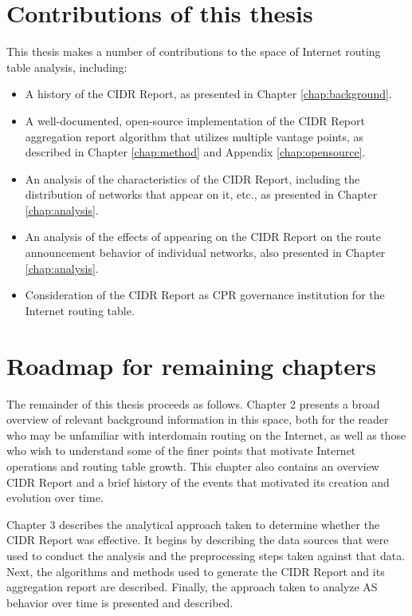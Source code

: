 \section{Contributions of this thesis}

This thesis makes a number of contributions to the space of Internet routing table analysis, including:
\begin{itemize}
\item{A history of the CIDR Report, as presented in Chapter \ref{chap:background}.}
\item{A well-documented, open-source implementation of the CIDR Report aggregation report algorithm that utilizes multiple vantage points, as described in Chapter \ref{chap:method} and Appendix \ref{chap:opensource}.}
\item{An analysis of the characteristics of the CIDR Report, including the distribution of networks that appear on it, etc., as presented in Chapter \ref{chap:analysis}.}
\item{An analysis of the effects of appearing on the CIDR Report on the route announcement behavior of individual networks, also presented in Chapter \ref{chap:analysis}.}
\item{Consideration of the CIDR Report as CPR governance institution for the Internet routing table.}
\end{itemize}

\section{Roadmap for remaining chapters}

The remainder of this thesis proceeds as follows. Chapter 2 presents a broad overview of relevant background information in this space, both for the reader who may be unfamiliar with interdomain routing on the Internet, as well as those who wish to understand some of the finer points that motivate Internet operations and routing table growth. This chapter also contains an overview CIDR Report and a brief history of the events that motivated its creation and evolution over time.

Chapter 3 describes the analytical approach taken to determine whether the CIDR Report was effective. It begins by describing the data sources that were used to conduct the analysis and the preprocessing steps taken against that data. Next, the algorithms and methods used to generate the CIDR Report and its aggregation report are described. Finally, the approach taken to analyze AS behavior over time is presented and described.

